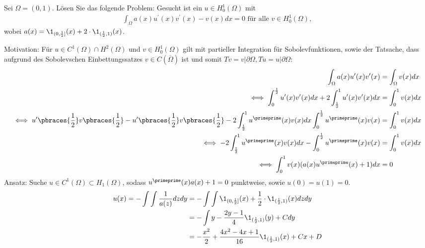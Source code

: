 
\begin{exercise}

Sei $\Omega = (0,1)$. Lösen Sie das folgende Problem: Gesucht ist ein $u \in H_0^1(\Omega)$ mit
\begin{align*}
  \int_\Omega a(x)u^{\prime}(x)v^{\prime}(x) - v(x) dx = 0 \text{ für alle } v \in H_0^1(\Omega),
\end{align*}
wobei $a(x) = \1_{(0,\frac{1}{2}]}(x) + 2\cdot\1_{(\frac{1}{2},1)}(x)$.
\end{exercise}


\begin{solution}
Motivation: Für $u \in C^1(\Omega) \cap H^2(\Omega)$ und $v \in H_0^1(\Omega)$ gilt
mit partieller Integration für Sobolevfunktionen, sowie der Tatsache, dass aufgrund
des Sobolevschen Einbettungssatzes $v \in C(\overline{\Omega})$ ist und somit
$Tv = v|\partial\Omega, Tu = u|\partial\Omega$:
\begin{align*}
  \int_\Omega a(x)u^{\prime}(x)v^{\prime}(x) &= \int_\Omega v(x) dx \\
  \iff \int_0^{\frac{1}{2}} u^{\prime}(x)v^{\prime}(x)dx + 2\int_{\frac{1}{2}}^1 u^{\prime}(x)v^{\prime}(x) dx &= \int_0^1 v(x) dx \\
  \iff u^{\prime}\pbraces{\frac{1}{2}}v\pbraces{\frac{1}{2}} - u^{\prime}\pbraces{\frac{1}{2}}v\pbraces{\frac{1}{2}} -
  2\int_{\frac{1}{2}}^1 u^{\primeprime}(x)v(x) dx \int_0^{\frac{1}{2}}u^{\primeprime}(x)v(x) &= \int_0^1 v(x) dx \\
  \iff - 2\int_{\frac{1}{2}}^1 u^{\primeprime}(x)v(x) dx - \int_0^{\frac{1}{2}}u^{\primeprime}(x)v(x) &= \int_0^1 v(x) dx \\
  \iff \int_0^1 v(x)(a(x)u^{\primeprime}(x) + 1) dx &= 0
\end{align*}
Ansatz: Suche $u \in C^1(\Omega) \subset H_1(\Omega)$, sodass $u^{\primeprime}(x)a(x) + 1 = 0$ punktweise, sowie $u(0) = u(1) = 0$.
\begin{align*}
  u(x) = -\int\int \frac{1}{a(z)} dz dy  &=
  -\int\int \1_{(0,\frac{1}{2}]}(x) + \frac{1}{2}\cdot\1_{(\frac{1}{2},1)}(x) dz dy  \\
  &= -\int y - \frac{2y-1}{4}\1_{(\frac{1}{2},1)}(y) + C dy \\
  &= -\frac{x^2}{2} + \frac{4x^2-4x+1}{16}\1_{(\frac{1}{2},1)}(x) + Cx + D
\end{align*}

\end{solution}
